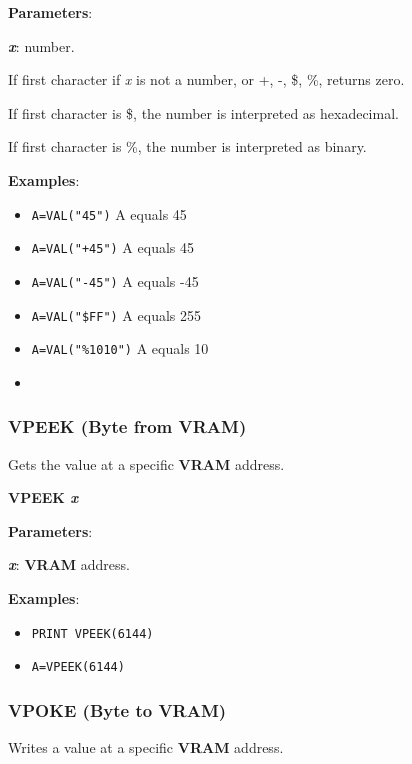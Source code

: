     \textbf{Parameters}:

    \hspace{1cm}\textbf{\textit{x}}: number.

    If first character if \textit{x} is not a number, or +, -, \$, \%, returns zero.

    If first character is \$, the number is interpreted as hexadecimal.

    If first character is \%, the number is interpreted as binary.

    \textbf{Examples}:
    \begin{itemize}
        \item \texttt{A=VAL("45")} A equals 45
        \item \texttt{A=VAL("+45")} A equals 45
        \item \texttt{A=VAL("-45")} A equals -45
        \item \texttt{A=VAL("\$FF")} A equals 255
        \item \texttt{A=VAL("\%1010")} A equals 10
        \item 
    \end{itemize}

    \subsubsection{{VPEEK (Byte from VRAM)}}
    \label{msbasic:lang:vpeek}
    Gets the value at a specific \textbf{VRAM} address.

    \hspace{1.9cm}\textbf{VPEEK \textit{x}}

    \textbf{Parameters}:

    \hspace{1cm}\textbf{\textit{x}}: \textbf{VRAM} address.

    \textbf{Examples}:
    \begin{itemize}
        \item \texttt{PRINT VPEEK(6144)}
        \item \texttt{A=VPEEK(6144)}
    \end{itemize}

    \subsubsection{{VPOKE (Byte to VRAM)}}
    \label{msbasic:lang:vpoke}
    Writes a value at a specific \textbf{VRAM} address.

